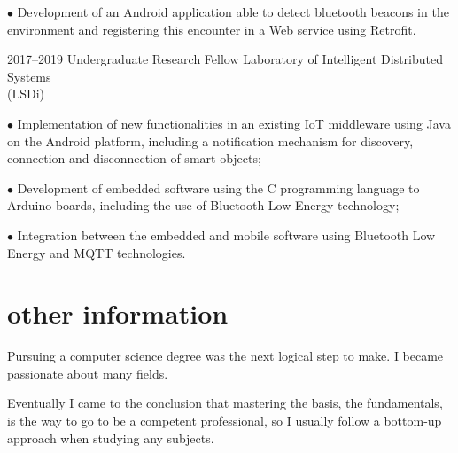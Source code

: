 \documentclass[]{../document-class/twentysecondcv}
\begin{document}
\begin{twenty}
{		$\bullet$ Development of an Android application able to detect bluetooth beacons in the environment and registering this encounter in a Web service using Retrofit.}

	\twentyitem
		{2017--2019} %
		{Undergraduate Research Fellow} %
		{Laboratory of Intelligent Distributed Systems \\\hspace*{\fill}(LSDi)}
		{$\bullet$ Implementation of new functionalities in an existing IoT middleware using Java on the Android platform, including a notification mechanism for discovery, connection and disconnection of smart objects;\vskip 4pt 


		$\bullet$ Development of embedded software using the C programming language to Arduino boards, including the use of Bluetooth Low Energy technology;\vskip 4pt 

		$\bullet$ Integration between the embedded and mobile software using Bluetooth Low Energy and MQTT technologies.}
		


\end{twenty}


\section{other information}

Pursuing a computer science degree was the next logical step to make. I became passionate about many fields.

Eventually I came to the conclusion that mastering the basis, the fundamentals, is the way to go to be a competent professional, so I usually follow a bottom-up approach when studying any subjects.




\end{document}
